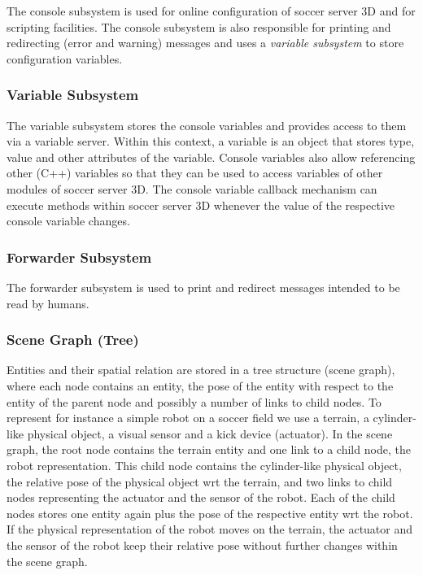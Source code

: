 \documentclass[a4paper,12pt]{article}
\begin{document}
The console subsystem is used for online configuration of soccer
server 3D and for scripting facilities. %
The console subsystem is also responsible for printing and redirecting
(error and warning) messages and uses a \emph{variable subsystem} to
store configuration variables.


\subsubsection{Variable Subsystem}

The variable subsystem stores the console variables and provides
access to them via a variable server. Within this context, a variable
is an object that stores type, value and other attributes of the
variable.  Console variables also allow referencing other (C++)
variables so that they can be used to access variables of other
modules of soccer server 3D. The console variable callback mechanism
can execute methods within soccer server 3D whenever the value of the
respective console variable changes.

\subsubsection{Forwarder Subsystem}

The forwarder subsystem is used to print and redirect messages
intended to be read by humans.

\subsubsection{Scene Graph (Tree)}

Entities and their spatial relation are stored in a tree
structure (scene graph), where each node contains an entity, the pose
of the entity with respect to the entity of the parent node and
possibly a number of links to child nodes. To represent for instance a
simple robot on a soccer field we use a terrain, a cylinder-like
physical object, a visual sensor and a kick device (actuator). In the
scene graph, the root node contains the terrain entity and one link to
a child node, the robot representation. This child node contains the
cylinder-like physical object, the relative pose of the physical
object wrt the terrain, and two links to child nodes representing the
actuator and the sensor of the robot. Each of the child nodes stores
one entity again plus the pose of the respective entity wrt the
robot. If the physical representation of the robot moves on the
terrain, the actuator and the sensor of the robot keep their relative
pose without further changes within the scene graph.
\end{document}
